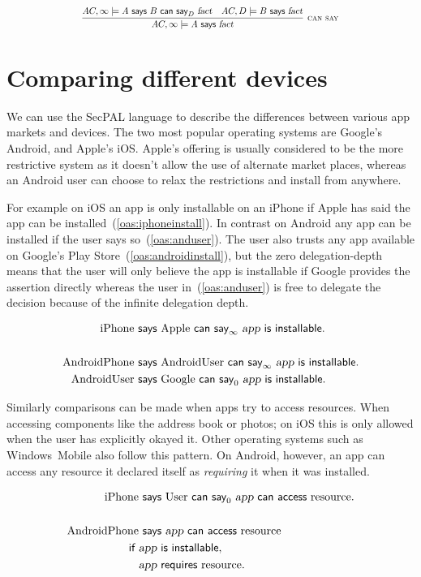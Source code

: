 \documentclass[]{llncs}
\newcommand{\keyword}[1]{\textsf{#1}}
\newcommand{\entity}[1]{\textrm{#1}}
\newcommand{\vari}[1]{\textsl{#1}}
\newcommand{\says}{\keyword{~says~}}
\newcommand{\cansay}[1]{\keyword{~can say}_{#1}~}
\newcommand{\iffacts}{\keyword{~if~}}
\newcommand{\installable}{\keyword{~is installable}}
\newcommand{\Google}{\entity{Google}}
\newcommand{\app}{\vari{app}}
\newcommand{\fact}{\vari{fact}}
\newcommand{\rrule}[1]{\textsc{\small #1}}
\newcommand{\rcansay}{\rrule{can say}}
\newcommand{\eref}[1]{(\ref{#1})}
\begin{document}
\begin{equation}
  \scalebox{0.8}{%
  \infer[\rcansay]{%
    AC,  \infty\models A\says\fact
  }{%
    AC,  \infty\models A\says B\cansay D\fact &
    AC,  D\models B\says\fact
  }}
  \label{rule:cansay}
\end{equation}

\section{Comparing different devices}

We can use the SecPAL language to describe the differences between various
app markets and devices.  The two most popular operating systems are Google's
Android, and Apple's {iOS}. Apple's offering is usually considered to be the more
restrictive system as it doesn't allow the use of alternate market places,
whereas an Android user can choose to relax the restrictions and install from
anywhere.

For example on iOS an app is only installable on an iPhone if Apple has said
the app can be installed~\eref{oas:iphoneinstall}. In contrast on Android any
app can be installed if the user says so~\eref{oas:anduser}. The user also
trusts any app available on Google's Play Store~\eref{oas:androidinstall}, but
the zero delegation-depth means that the user will only believe the app is
installable if Google provides the assertion directly whereas the user
in~\eref{oas:anduser} is free to delegate the decision because of the infinite
delegation depth.

\begin{align}
  \entity{iPhone}&\says\entity{Apple}\cansay\infty\app\installable.
  \label{oas:iphoneinstall}\\
  \\
  \entity{AndroidPhone}&\says\entity{AndroidUser}\cansay\infty\app\installable.\label{oas:anduser}\\
  \entity{AndroidUser}&\says\Google\cansay0\app\installable.
  \label{oas:androidinstall}
\end{align}

Similarly comparisons can be made when apps try to access resources.
When accessing components like the address book or photos; on iOS this
is only allowed when the user has explicitly okayed it. Other operating systems
such as Windows~Mobile also follow this pattern.
On Android, however, an app can access any resource it declared itself as
\emph{requiring} it when it was installed.

\begin{align}
  \entity{iPhone}&\says\entity{User}\cansay0\app\keyword{~can access~}\entity{resource}.\\
  \\
  \entity{AndroidPhone}&\says\app\keyword{~can access~}\entity{resource} \nonumber \\
  \iffacts&\app\installable, \nonumber\\
  &\app\keyword{~requires~}\entity{resource}.
\end{align}
\end{document}
